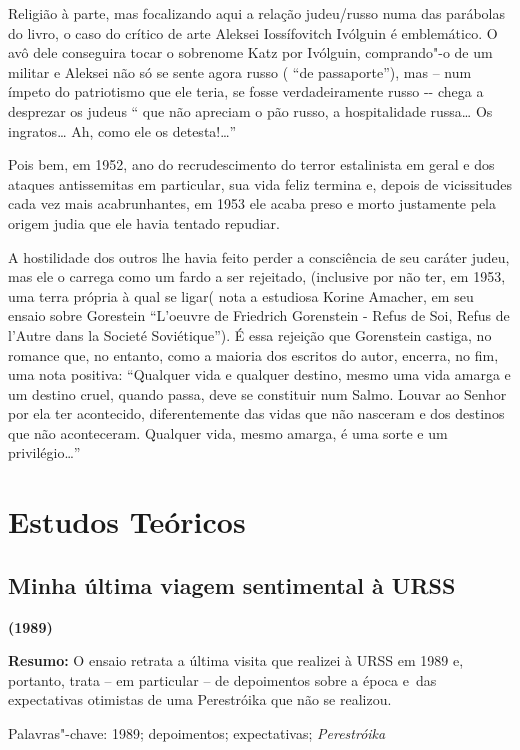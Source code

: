 Religião à parte, mas focalizando aqui a relação judeu/russo numa das
parábolas do livro, o caso do crítico de arte Aleksei Iossífovitch
Ivólguin é emblemático. O avô dele conseguira tocar o sobrenome Katz por
Ivólguin, comprando"-o de um militar e Aleksei não só se sente agora
russo ( ``de passaporte''), mas -- num ímpeto do patriotismo que ele
teria, se fosse verdadeiramente russo -\/- chega a desprezar os judeus
`` que não apreciam o pão russo, a hospitalidade russa\ldots{} Os ingratos\ldots{}
Ah, como ele os detesta!\ldots{}''

Pois bem, em 1952, ano do recrudescimento do terror estalinista em geral
e dos ataques antissemitas em particular, sua vida feliz termina e,
depois de vicissitudes cada vez mais acabrunhantes, em 1953 ele acaba
preso e morto justamente pela origem judia que ele havia tentado
repudiar.

A hostilidade dos outros lhe havia feito perder a consciência de seu
caráter judeu, mas ele o carrega como um fardo a ser rejeitado,
(inclusive por não ter, em 1953, uma terra própria à qual se ligar( nota
a estudiosa Korine Amacher, em seu ensaio sobre Gorestein ``L'oeuvre de
Friedrich Gorenstein - Refus de Soi, Refus de l'Autre dans la Societé
Soviétique''). É essa rejeição que Gorenstein castiga, no romance que, no entanto, como a maioria dos escritos do autor, encerra,
no fim, uma nota positiva: ``Qualquer vida e qualquer destino, mesmo uma
vida amarga e um destino cruel, quando passa, deve se constituir num
Salmo. Louvar ao Senhor por ela ter acontecido, diferentemente das vidas
que não nasceram e dos destinos que não aconteceram. Qualquer vida,
mesmo amarga, é uma sorte e um privilégio\ldots{}''

\part{Estudos Teóricos}

\chapter{Minha última viagem sentimental à URSS}

\textbf{(1989)}

\textbf{Resumo:} O ensaio retrata a última visita que realizei à URSS em
1989 e, portanto, trata -- em particular -- de depoimentos sobre a época
e~das expectativas otimistas de uma Perestróika que não se realizou.

Palavras"-chave: 1989; depoimentos; expectativas; \emph{Perestróika}

